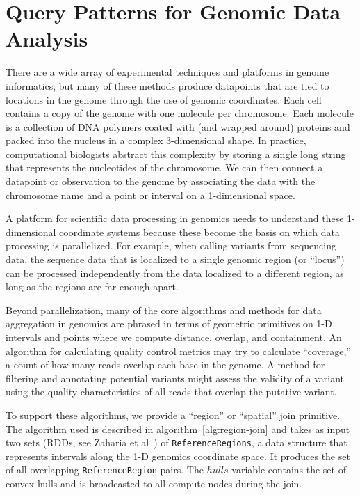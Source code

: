 \documentclass[phd]{ucbthesis}
\begin{document}
\section{Query Patterns for Genomic Data Analysis}
\label{sec:query-patterns}

There are a wide array of experimental techniques and platforms in genome informatics, but many of these
methods produce datapoints that are tied to locations in the genome through the use of genomic coordinates.
Each cell contains a copy of the genome with one molecule per chromosome. Each molecule is a collection of
DNA polymers coated with (and wrapped around) proteins and packed into the nucleus in a complex
3-dimensional shape. In practice, computational biologists abstract this complexity by storing a single long
string that represents the nucleotides of the chromosome. We can then connect a datapoint or observation to the
genome by associating the data with the chromosome name and a point or interval on a 1-dimensional space.

A platform for scientific data processing in genomics needs to understand these 1-dimensional coordinate
systems because these become the basis on which data processing is parallelized. For example, when calling
variants from sequencing data, the sequence data that is localized to a single genomic region (or ``locus'') can be 
processed independently from the data localized to a different region, as long as the regions are far enough
apart.

Beyond parallelization, many of the core algorithms and methods for data aggregation in genomics are phrased
in terms of geometric primitives on 1-D intervals and points where we compute distance, overlap, and
containment.  An algorithm for calculating quality control metrics may try to calculate ``coverage,'' a count
of how many reads overlap each base in the genome. A method for filtering and annotating potential variants
might assess the validity of a variant using the quality characteristics of all reads that overlap the putative variant.

To support these algorithms, we provide a ``region'' or ``spatial'' join primitive. The algorithm used is described
in algorithm~\ref{alg:region-join} and takes as input two sets (RDDs, see Zaharia et al~\cite{zaharia12}) of
\texttt{ReferenceRegions}, a data structure that represents intervals along the 1-D genomics coordinate
space. It produces the set of all overlapping \texttt{ReferenceRegion} pairs. The $hulls$ variable contains
the set of convex hulls and is broadcasted to all compute nodes during the join.
\end{document}
